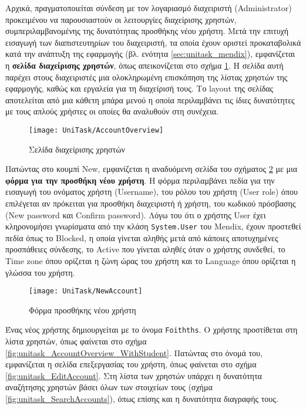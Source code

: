         Αρχικά, πραγματοποιείται σύνδεση με τον λογαριασμό διαχειριστή (Administrator) προκειμένου να παρουσιαστούν οι λειτουργίες διαχείρισης χρηστών, συμπεριλαμβανομένης της δυνατότητας προσθήκης νέου χρήστη. Μετά την επιτυχή εισαγωγή των διαπιστευτηρίων του διαχειριστή, τα οποία έχουν οριστεί προκαταβολικά κατά την ανάπτυξη της εφαρμογής (βλ. ενότητα \ref{sec:unitask_mendix}), εμφανίζεται η \textbf{σελίδα διαχείρισης χρηστών}, όπως απεικονίζεται στο σχήμα \ref{fig:unitask_AccountOverview}. Η σελίδα αυτή παρέχει στους διαχειριστές μια ολοκληρωμένη επισκόπηση της λίστας χρηστών της εφαρμογής, καθώς και εργαλεία για τη διαχείρισή τους. Το layout της σελίδας αποτελείται από μια κάθετη μπάρα μενού η οποία περιλαμβάνει τις ίδιες δυνατότητες με τους απλούς χρήστες οι οποίες θα αναλυθούν στη συνέχεια.

       \begin{figure}[h!] \noindent \centering
            \texttt{[image: UniTask/AccountOverview]}
            \caption{\centering Σελίδα διαχείρισης χρηστών}
            \label{fig:unitask_AccountOverview}
        \end{figure}

        Πατώντας στο κουμπί {\Zona New}, εμφανίζεται η αναδυόμενη σελίδα του σχήματος \ref{fig:unitask_NewAccount} με μια \textbf{φόρμα για την προσθήκη νέου χρήστη}. Η φόρμα περιλαμβάνει πεδία για την εισαγωγή του ονόματος χρήστη ({\Zona Username}), του ρόλου του χρήστη ({\Zona User role}) όπου επιλέγεται αν πρόκειται για προσθήκη διαχειριστή ή χρήστη, του κωδικού πρόσβασης ({\Zona New password} και {\Zona Confirm password}). Λόγω του ότι ο χρήστης User έχει κληρονομήσει γνωρίσματα από την κλάση \texttt{System.User} του Mendix, έχουν προστεθεί πεδία όπως το {\Zona Blocked}, η οποία γίνεται αληθής μετά από κάποιες αποτυχημένες προσπάθειες σύνδεσης, το {\Zona Active} που γίνεται αληθές όταν ο χρήστης συνδεθεί, το {\Zona Time zone} όπου ορίζεται η ζώνη ώρας του χρήστη και το {\Zona Language} όπου ορίζεται η γλώσσα του χρήστη.

        \begin{figure}[h!] \noindent \centering
            \texttt{[image: UniTask/NewAccount]}
            \caption{\centering Φόρμα προσθήκης νέου χρήστη}
            \label{fig:unitask_NewAccount}
        \end{figure}

        Ένας νέος χρήστης δημιουργείται με το όνομα \texttt{Foithths}. Ο χρήστης προστίθεται στη λίστα χρηστών, όπως φαίνεται στο σχήμα \ref{fig:unitask_AccountOverview_WithStudent}. Πατώντας στο όνομά του, εμφανίζεται η σελίδα επεξεργασίας του χρήστη, όπως φαίνεται στο σχήμα \ref{fig:unitask_EditAccount}. Στη λίστα των χρηστών υπάρχει η δυνατότητα αναζήτησης χρηστών βάσει όλων των στοιχείων τους (σχήμα \ref{fig:unitask_SearchAccounts}), όπως επίσης και η δυνατότητα διαγραφής τους.

